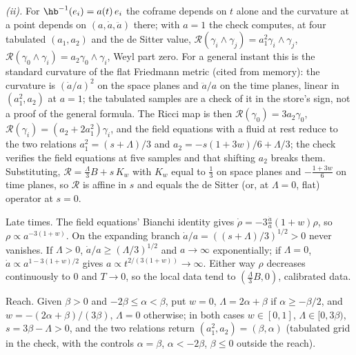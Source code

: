 \emph{(ii).} For $\hb^{-1}(e_{i}) = a(t)\,e_{i}$ the coframe depends on $t$ alone and the curvature at a point depends on $(a, \dot a, \ddot a)$ there; with $a = 1$ the check computes, at four tabulated $(a_{1}, a_{2})$ and the de Sitter value, $\mathcal{R}(\gamma_{i}\wedge\gamma_{j}) = a_{1}^{2}\gamma_{i}\wedge\gamma_{j}$, $\mathcal{R}(\gamma_{0}\wedge\gamma_{i}) = a_{2}\gamma_{0}\wedge\gamma_{i}$, Weyl part zero. For a general instant this is the standard curvature of the flat Friedmann metric (cited from memory): the curvature is $(\dot a/a)^{2}$ on the space planes and $\ddot a/a$ on the time planes, linear in $(a_{1}^{2}, a_{2})$ at $a = 1$; the tabulated samples are a check of it in the store's sign, not a proof of the general formula. The Ricci map is then $\mathcal{R}(\gamma_{0}) = 3a_{2}\gamma_{0}$, $\mathcal{R}(\gamma_{i}) = (a_{2} + 2a_{1}^{2})\gamma_{i}$, and the field equations with a fluid at rest reduce to the two relations $a_{1}^{2} = (s + \Lambda)/3$ and $a_{2} = -s(1 + 3w)/6 + \Lambda/3$; the check verifies the field equations at five samples and that shifting $a_{2}$ breaks them. Substituting, $\mathcal{R} = \tfrac{\Lambda}{3}B + s\,K_{w}$ with $K_{w}$ equal to $\tfrac13$ on space planes and $-\tfrac{1+3w}{6}$ on time planes, so $\mathcal{R}$ is affine in $s$ and equals the de Sitter (or, at $\Lambda = 0$, flat) operator at $s = 0$.

Late times. The field equations' Bianchi identity gives $\dot\rho = -3\tfrac{\dot a}{a}(1+w)\rho$, so $\rho \propto a^{-3(1+w)}$. On the expanding branch $\dot a/a = ((s + \Lambda)/3)^{1/2} > 0$ never vanishes. If $\Lambda > 0$, $\dot a/a \ge (\Lambda/3)^{1/2}$ and $a \to \infty$ exponentially; if $\Lambda = 0$, $\dot a \propto a^{1 - 3(1+w)/2}$ gives $a \propto t^{2/(3(1+w))} \to \infty$. Either way $\rho$ decreases continuously to $0$ and $T \to 0$, so the local data tend to $(\tfrac{\Lambda}{3}B, 0)$, calibrated data.

Reach. Given $\beta > 0$ and $-2\beta \le \alpha < \beta$, put $w = 0$, $\Lambda = 2\alpha + \beta$ if $\alpha \ge -\beta/2$, and $w = -(2\alpha + \beta)/(3\beta)$, $\Lambda = 0$ otherwise; in both cases $w \in [0,1]$, $\Lambda \in [0, 3\beta)$, $s = 3\beta - \Lambda > 0$, and the two relations return $(a_{1}^{2}, a_{2}) = (\beta, \alpha)$ (tabulated grid in the check, with the controls $\alpha = \beta$, $\alpha < -2\beta$, $\beta \le 0$ outside the reach).

